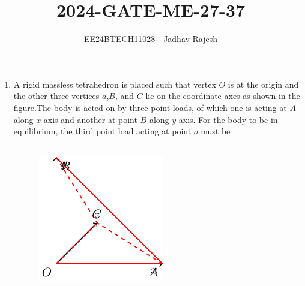 \documentclass[journal]{IEEEtran}
\begin{document}

\vspace{3cm}
\title{2024-GATE-ME-27-37}
\author{EE24BTECH11028 - Jadhav Rajesh}
{\let\newpage\relax\maketitle}

\renewcommand{\thefigure}{\theenumi}
\renewcommand{\thetable}{\theenumi}
\setlength{\intextsep}{10pt} %


\renewcommand{\thetable}{\theenumi}
\begin{enumerate}
\item A rigid massless tetrahedron is placed such that vertex $O$ is at the origin and the other three vertices $a$,$B$, and $C$ lie on the coordinate axes as shown in the figure.The body is acted on by three point loads, of which one is acting at $A$ along $x$-axis and another at point $B$ along $y$-axis. For the body to be in equilibrium, the third point load acting at point $o$ must be\\\\
\begin{figure}[h!]
         \centering
        \includegraphics[width=0.7\linewidth]{figure/fig1/fig1.pdf}
		\caption{}
        \label{stemplot}


\end{figure}
\end{enumerate}
\end{document}

